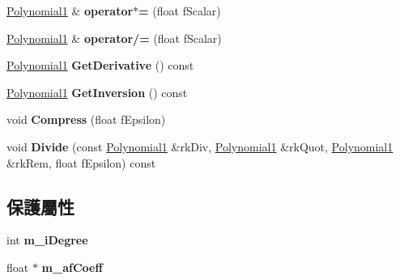 \begin{DoxyCompactItemize}
\item 
\hyperlink{class_magnum_1_1_polynomial1}{Polynomial1} \& {\bfseries operator$\ast$=} (float f\+Scalar)\hypertarget{class_magnum_1_1_polynomial1_a5d42cff8ef12f6cf6c0a5123f59ed748}{}\label{class_magnum_1_1_polynomial1_a5d42cff8ef12f6cf6c0a5123f59ed748}

\item 
\hyperlink{class_magnum_1_1_polynomial1}{Polynomial1} \& {\bfseries operator/=} (float f\+Scalar)\hypertarget{class_magnum_1_1_polynomial1_ad16d5787b2835069284ccc26941f66c1}{}\label{class_magnum_1_1_polynomial1_ad16d5787b2835069284ccc26941f66c1}

\item 
\hyperlink{class_magnum_1_1_polynomial1}{Polynomial1} {\bfseries Get\+Derivative} () const \hypertarget{class_magnum_1_1_polynomial1_a47f8fcf613472621ea604c9a7fc1f755}{}\label{class_magnum_1_1_polynomial1_a47f8fcf613472621ea604c9a7fc1f755}

\item 
\hyperlink{class_magnum_1_1_polynomial1}{Polynomial1} {\bfseries Get\+Inversion} () const \hypertarget{class_magnum_1_1_polynomial1_a8e3abc49b94e5bd004bdd025657447d9}{}\label{class_magnum_1_1_polynomial1_a8e3abc49b94e5bd004bdd025657447d9}

\item 
void {\bfseries Compress} (float f\+Epsilon)\hypertarget{class_magnum_1_1_polynomial1_a19a5e96867f6ba142575763823591dda}{}\label{class_magnum_1_1_polynomial1_a19a5e96867f6ba142575763823591dda}

\item 
void {\bfseries Divide} (const \hyperlink{class_magnum_1_1_polynomial1}{Polynomial1} \&rk\+Div, \hyperlink{class_magnum_1_1_polynomial1}{Polynomial1} \&rk\+Quot, \hyperlink{class_magnum_1_1_polynomial1}{Polynomial1} \&rk\+Rem, float f\+Epsilon) const \hypertarget{class_magnum_1_1_polynomial1_aadc0b98cef6fe2f72af30205499c45ae}{}\label{class_magnum_1_1_polynomial1_aadc0b98cef6fe2f72af30205499c45ae}

\end{DoxyCompactItemize}
\subsection*{保護屬性}
\begin{DoxyCompactItemize}
\item 
int {\bfseries m\+\_\+i\+Degree}\hypertarget{class_magnum_1_1_polynomial1_a42950f62be9d21a6b52a8db03e356860}{}\label{class_magnum_1_1_polynomial1_a42950f62be9d21a6b52a8db03e356860}

\item 
float $\ast$ {\bfseries m\+\_\+af\+Coeff}\hypertarget{class_magnum_1_1_polynomial1_aa07839d590a4b0dce5933b24cae1ddb9}{}\label{class_magnum_1_1_polynomial1_aa07839d590a4b0dce5933b24cae1ddb9}

\end{DoxyCompactItemize}



